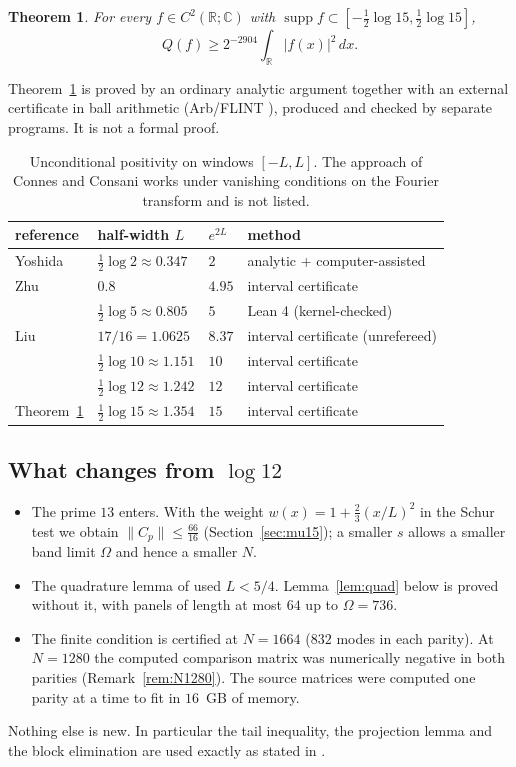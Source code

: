 \documentclass[11pt]{amsart}
\newtheorem{theorem}{Theorem}
\theoremstyle{remark}
\numberwithin{equation}{section}
\newcommand{\R}{\mathbb{R}}
\newcommand{\C}{\mathbb{C}}
\begin{document}
\begin{theorem}\label{thm:O}
For every $f\in C^2(\R;\C)$ with $\operatorname{supp}f\subset[-\frac12\log15,\frac12\log15]$,
\[
Q(f)\ge2^{-2904}\int_\R|f(x)|^2\,dx .
\]
\end{theorem}

Theorem~\ref{thm:O} is proved by an ordinary analytic argument together with an external certificate in ball arithmetic (Arb/FLINT \cite{Arb}), produced and checked by separate programs. It is not a formal proof.

\begin{table}[h]
\centering\small
\begin{tabular}{llll}
\toprule
reference & half-width $L$ & $e^{2L}$ & method\\
\midrule
Yoshida \cite{Yoshida1992} & $\frac12\log2\approx0.347$ & $2$ & analytic + computer-assisted\\
Zhu \cite{Zhu2026} & $0.8$ & $4.95$ & interval certificate\\
\cite{MoriLog5} & $\frac12\log5\approx0.805$ & $5$ & Lean 4 (kernel-checked)\\
Liu \cite{Liu2026} & $17/16=1.0625$ & $8.37$ & interval certificate (unrefereed)\\
\cite{MoriVI} & $\frac12\log10\approx1.151$ & $10$ & interval certificate\\
\cite{MoriVII} & $\frac12\log12\approx1.242$ & $12$ & interval certificate\\
Theorem~\ref{thm:O} & $\frac12\log15\approx1.354$ & $15$ & interval certificate\\
\bottomrule
\end{tabular}
\caption{Unconditional positivity on windows $[-L,L]$. The approach of Connes and Consani \cite{CC20} works under vanishing conditions on the Fourier transform and is not listed.}
\end{table}

\subsection{What changes from \texorpdfstring{$\log12$}{log 12}}
\begin{itemize}
\item The prime $13$ enters. With the weight $w(x)=1+\frac23(x/L)^2$ in the Schur test we obtain $\|C_p\|\le\frac{66}{16}$ (Section~\ref{sec:mu15}); a smaller $s$ allows a smaller band limit $\Omega$ and hence a smaller $N$.
\item The quadrature lemma of \cite{MoriVII} used $L<5/4$. Lemma~\ref{lem:quad} below is proved without it, with panels of length at most $64$ up to $\Omega=736$.
\item The finite condition is certified at $N=1664$ ($832$ modes in each parity). At $N=1280$ the computed comparison matrix was numerically negative in both parities (Remark~\ref{rem:N1280}). The source matrices were computed one parity at a time to fit in $16$~GB of memory.
\end{itemize}
Nothing else is new. In particular the tail inequality, the projection lemma and the block elimination are used exactly as stated in \cite{MoriVII}.
\end{document}
